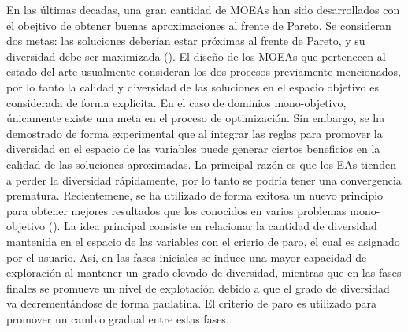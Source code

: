 En las últimas decadas, una gran cantidad de MOEAs han sido desarrollados con el obejtivo de obtener buenas aproximaciones al frente de Pareto.
%
Se consideran dos metas: las soluciones deberían estar próximas al frente de Pareto, y su diversidad debe ser maximizada (\cite{Joel:TUTORIAL_EMOA}).
%
El diseño de los MOEAs que pertenecen al estado-del-arte usualmente consideran los dos procesos previamente mencionados, por lo tanto la calidad y diversidad de las soluciones en el espacio objetivo es considerada de forma explícita.
En el caso de dominios mono-objetivo, únicamente existe una meta en el proceso de optimización.
%
Sin embargo, se ha demostrado de forma experimental que al integrar las reglas para promover la diversidad en el espacio de las variables puede generar ciertos beneficios en la calidad de las soluciones aproximadas.
%
La principal razón es que los EAs tienden a perder la diversidad rápidamente, por lo tanto se podría tener una convergencia prematura.
%
Recientemene, se ha utilizado de forma exitosa un nuevo principio para obtener mejores resultados que los conocidos en varios problemas mono-objetivo (\cite{Joel:MULTI_DYNAMIC}).
%
La idea principal consiste en relacionar la cantidad de diversidad mantenida en el espacio de las variables con el crierio de paro, el cual es asignado por el usuario.
%
Así, en las fases iniciales se induce una mayor capacidad de exploración al mantener un grado elevado de diversidad, mientras que en las fases finales se promueve un nivel de explotación debido a que el grado de diversidad va decrementándose de forma paulatina.
%
El criterio de paro es utilizado para promover un cambio gradual entre estas fases.

